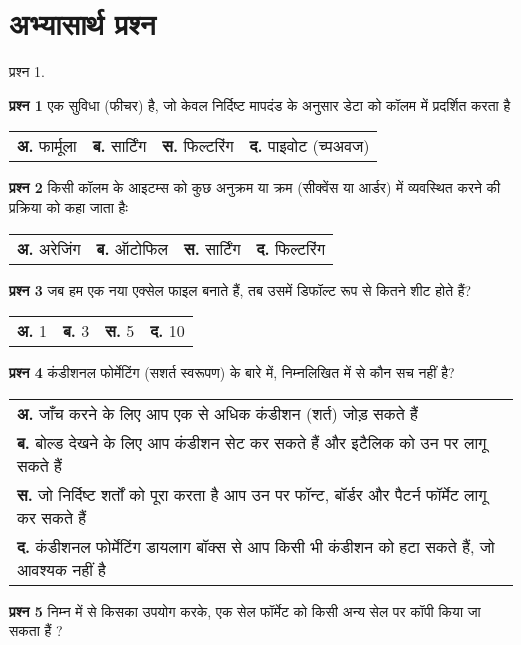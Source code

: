 \section*{अभ्यासार्थ प्रश्न}

\def\paragraphTitle#1{\medbreak\noindent{\bfseries #1}}
\paragraphTitle{वस्तुनिष्ठ प्रश्नः}
\begin{descriptionSimple}{प्रश्न 1.}
\item[\textbf{प्रश्न 1}] एक सुविधा (फीचर) है, जो केवल निर्दिष्ट मापदंड के अनुसार डेटा को कॉलम में प्रदर्शित करता है

	\begin{tabular}{llll}
	\textbf{अ.}  फार्मूला & \textbf{ब.}  सार्टिंग & \textbf{स.}  फिल्टरिंग & \textbf{द.} पाइवोट (च्पअवज)
	\end{tabular}

\item[\textbf{प्रश्न 2}] किसी कॉलम के आइटम्स को कुछ अनुक्रम या क्रम (सीक्वेंस या आर्डर) में व्यवस्थित करने की प्रक्रिया को कहा जाता हैः

	\begin{tabular}{llll}
		\textbf{अ.}  अरेजिंग & 
		\textbf{ब.} ऑटोफिल & 
		\textbf{स.} सार्टिंग &
		\textbf{द.} फिल्टरिंग
	\end{tabular}		
\item[\textbf{प्रश्न 3}] जब हम एक नया एक्सेल फाइल बनाते हैं, तब उसमें डिफॉल्ट रूप से कितने शीट होते हैं?

		\begin{tabular}{llll}
		\textbf{अ.}  1  &
		\textbf{ब.} 3  &
		\textbf{स.} 5  &
		\textbf{द.} 10
		\end{tabular}
\item[\textbf{प्रश्न 4}] कंडीशनल फोर्मेटिंग (सशर्त स्वरूपण) के बारे में, निम्नलिखित में से कौन सच नहीं है?

		\begin{tabular}{p{}}
		\textbf{अ.}  जाँच करने के लिए आप एक से अधिक कंडीशन (शर्त) जोड़ सकते हैं\\
		\textbf{ब.} बोल्ड देखने के लिए आप कंडीशन सेट कर सकते हैं और इटैलिक को उन पर लागू सकते हैं \\
		\textbf{स.} जो निर्दिष्ट शर्तों को पूरा करता है आप उन पर फॉन्ट, बॉर्डर और पैटर्न फॉर्मेट लागू कर सकते हैं\\
		\textbf{द.} कंडीशनल फोर्मेटिंग डायलाग बॉक्स से आप किसी भी कंडीशन को हटा सकते हैं, जो आवश्यक नहीं है
		\end{tabular}
\item[\textbf{प्रश्न 5}] निम्न में से किसका उपयोग करके, एक सेल फॉर्मेट को किसी अन्य सेल पर कॉपी किया जा सकता हैं ?


\end{descriptionSimple}
